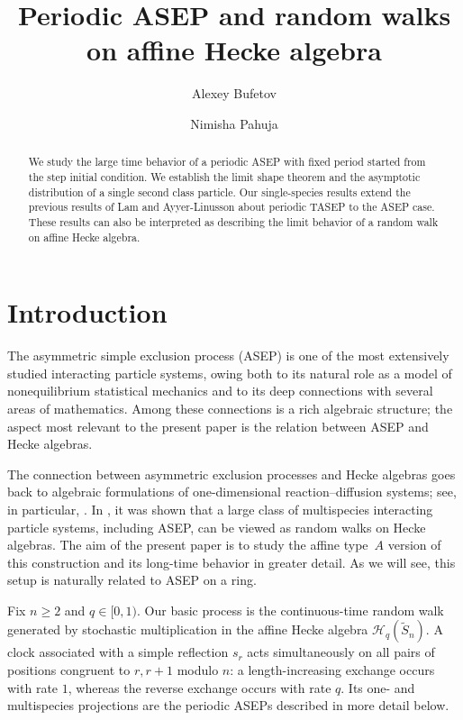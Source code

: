 \documentclass[11pt,a4paper]{amsart}
\title[Periodic ASEP and affine Hecke walks]
{Periodic ASEP and random walks on affine Hecke algebra}
\author{Alexey Bufetov}
\author{Nimisha Pahuja}
\date{}
\theoremstyle{definition}
\theoremstyle{remark}
\numberwithin{equation}{section}
\newcommand{\wtS}{\widetilde S_n}
\begin{document}
	
	\maketitle
	
	\begin{abstract}
		We study the large time behavior of a periodic ASEP with fixed period started from the step initial condition. We establish the limit shape theorem and the asymptotic distribution of a single second class particle. Our single-species results extend the previous results of Lam and Ayyer-Linusson about periodic TASEP to the ASEP case. These results can also be interpreted as describing the limit behavior of a random walk on affine Hecke algebra. 
	\end{abstract}
	
	\section{Introduction}
	\label{sec:Intro}
	
	The asymmetric simple exclusion process (ASEP) is one of the most extensively
	studied interacting particle systems, owing both to its natural role as a
	model of nonequilibrium statistical mechanics and to its deep connections
	with several areas of mathematics.  Among these connections is a rich
	algebraic structure; the aspect most relevant to the present paper is the relation
	between ASEP and Hecke algebras.
	
	The connection between asymmetric exclusion processes and Hecke algebras
	goes back to algebraic formulations of one-dimensional reaction--diffusion
	systems; see, in particular, \cite{AlcarazDrozHenkelRittenberg}.  In
	\cite{BufetovHecke}, it was shown that a large class of multispecies
	interacting particle systems, including ASEP, can be viewed as random walks
	on Hecke algebras.  The aim of the present paper is to study the affine
	type~$A$ version of this construction and its long-time behavior in greater
	detail.  As we will see, this setup is naturally related to ASEP on a ring.
	
	Fix $n\ge2$ and $q\in[0,1)$.  Our basic process is the continuous-time
	random walk generated by stochastic multiplication in the affine Hecke
	algebra $\mathscr H_q(\wtS)$.  A clock associated with a simple reflection
	$s_r$ acts simultaneously on all pairs of positions congruent to $r,r+1$
	modulo $n$: a length-increasing exchange occurs with rate $1$, whereas the
	reverse exchange occurs with rate $q$.  Its one- and multispecies
	projections are the periodic ASEPs described in more detail below. 
	
\end{document}
